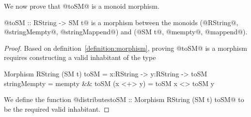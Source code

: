 We now prove that @toSM@ is a monoid morphism.
%
\begin{theorem}\label{theorem:smmorphism}
@toSM :: RString -> SM t@ is a morphism between the monoids
(@RString@, @stringMempty@, @stringMappend@) and (@SM t@, @mempty@, @mappend@).
\end{theorem}
\begin{proof}
Based on definition~\ref{definition:morphism}, proving @toSM@
is a morphism requires constructing a valid inhabitant of the type
\begin{code}
Morphism RString (SM t) toSM
  = x:RString -> y:RString
  -> {toSM stringMempty = mempty && toSM (x <+> y) = toSM x <> toSM y}
\end{code}
%
We define the function @distributestoSM :: Morphism RString (SM t) toSM@
to be the required valid inhabitant.


\end{proof}
